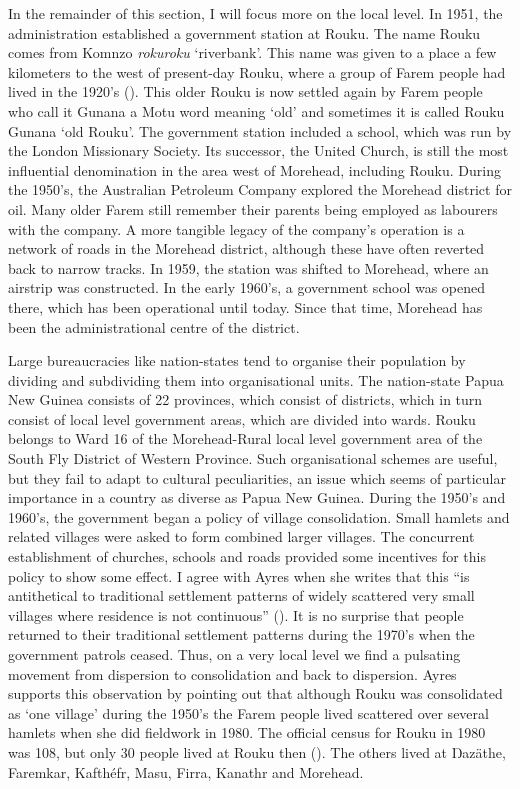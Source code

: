 In the remainder of this section, I will focus more on the local level. In 1951, the administration established a government station at Rouku. The name Rouku comes from Komnzo \emph{rokuroku} `riverbank'. This name was given to a place a few kilometers to the west of present-day Rouku, where a group of Farem people had lived in the 1920's (\citealt[14]{Ayres:ws}). This older Rouku is now settled again by Farem people who call it Gunana {\textendash} a Motu word meaning `old' {\textendash} and sometimes it is called Rouku Gunana `old Rouku'. The government station included a school, which was run by the London Missionary Society. Its successor, the United Church, is still the most influential denomination in the area west of Morehead, including Rouku. During the 1950's, the Australian Petroleum Company explored the Morehead district for oil. Many older Farem still remember their parents being employed as labourers with the company. A more tangible legacy of the company's operation is a network of roads in the Morehead district, although these have often reverted back to narrow tracks. In 1959, the station was shifted to Morehead, where an airstrip was constructed. In the early 1960's, a government school was opened there, which has been operational until today. Since that time, Morehead has been the administrational centre of the district.%

Large bureaucracies like nation-states tend to organise their population by dividing and subdividing them into organisational units. The nation-state Papua New Guinea consists of 22 provinces, which consist of districts, which in turn consist of local level government areas, which are divided into wards. Rouku belongs to Ward 16 of the Morehead-Rural local level government area of the South Fly District of Western Province. Such organisational schemes are useful, but they fail to adapt to cultural peculiarities, an issue which seems of particular importance in a country as diverse as Papua New Guinea. During the 1950's and 1960's, the government began a policy of village consolidation. Small hamlets and related villages were asked to form combined larger villages. The concurrent establishment of churches, schools and roads provided some incentives for this policy to show some effect. I agree with Ayres when she writes that this ``is antithetical to traditional settlement patterns of widely scattered very small villages where residence is not continuous'' (\citeyear[17]{Ayres:ws}). It is no surprise that people returned to their traditional settlement patterns during the 1970's when the government patrols ceased. Thus, on a very local level we find a pulsating movement from dispersion to consolidation and back to dispersion. Ayres supports this observation by pointing out that {\textendash} although Rouku was consolidated as `one village' during the 1950's {\textendash} the Farem people lived scattered over several hamlets when she did fieldwork in 1980. The official census for Rouku in 1980 was 108, but only 30 people lived at Rouku then (\citeyear[17]{Ayres:ws}). The others lived at Ŋazäthe, Faremkar, Kafthéfr, Masu, Firra, Kanathr and Morehead.%

